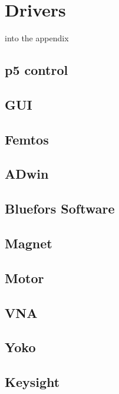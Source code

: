 \section{Drivers}
    into the appendix
    \subsection{p5 control}
    \subsection{GUI}
    \subsection{Femtos}
    \subsection{ADwin}
    \subsection{Bluefors Software}
    \subsection{Magnet}
    \subsection{Motor}
    \subsection{VNA}
    \subsection{Yoko}
    \subsection{Keysight}
